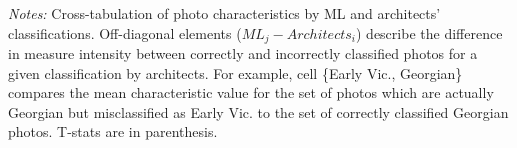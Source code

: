 \documentclass[]{article}
\begin{document}
\begin{table}[!htb]
\begin{tabular}{lrrrrrrr}
\end{tabular} 
 \begin{minipage}{\textwidth} 
\footnotesize 
\vspace{0.25cm}
\emph{Notes:} Cross-tabulation of photo characteristics by ML and architects' classifications. Off-diagonal elements ($ML_{j}-Architects_{i}$) describe the difference in measure intensity between correctly and incorrectly classified photos for a given classification by architects. For example, cell \{Early Vic., Georgian\} compares the mean characteristic value for the set of photos which are actually Georgian but misclassified as Early Vic. to the set of correctly classified Georgian photos. T-stats are in parenthesis.
\end{minipage} 
\endgroup 
\end{table}
\newpage
\end{document}
